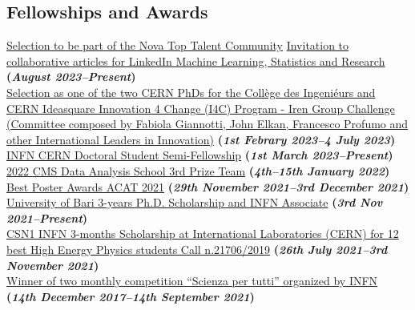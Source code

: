 \documentclass[11pt]{res}
\newcommand{\MarginText}[1]{\section{#1}\vspace{10pt}}
\begin{document}
\begin{resume}
\MarginText{Fellowships and Awards}
\href{https://digital-agent.novatalent.net/open/certificate/1OBEUZCU6M7ZHHROVP0F8870F}{Selection to be part of the Nova Top Talent Community}
\href{https://www.linkedin.com/advice/1/how-do-you-avoid-bias-machine-learning-imbalanced}{Invitation to collaborative articles for LinkedIn Machine Learning, Statistics and Research} \textbf{(\textit{August 2023--Present})}\\
\href{https://www.repubblica.it/tecnologia/2023/07/06/news/innovation_4_change__industry_leaders_summit_cern_di_ginevra-406876410/}{Selection as one of the two CERN PhDs for the Collège des Ingeniéurs and CERN Ideasquare Innovation 4 Change (I4C) Program - Iren Group Challenge (Committee composed by Fabiola Giannotti, John Elkan, Francesco Profumo and other International Leaders in Innovation)} \textbf{(\textit{1st Febrary 2023--4 July 2023})}\\
\href{https://drive.google.com/file/d/1gvGcpn9FgzyjUBVwmCCa8zAbnvYefJAa/view?usp=share_link}{INFN CERN Doctoral Student Semi-Fellowship} \textbf{(\textit{1st March 2023--Present})}\\
\href{https://indico.cern.ch/event/1088671/}{2022 CMS Data Analysis School 3rd Prize Team} \textbf{(\textit{4th--15th January 2022})}\\
\href{https://indico.cern.ch/event/855454/contributions/4596351/}{Best Poster Awards ACAT 2021} \textbf{(\textit{29th November 2021--3rd December 2021})}\\
\href{https://dottorato.fisica.uniba.it}{University of Bari 3-years Ph.D. Scholarship and INFN Associate} \textbf{(\textit{3rd Nov 2021--Present})}\\
\href{https://drive.google.com/file/d/1-3EpNjAJlxgwI7W7nlvAxtIPrqbM1Xud/view?usp=sharing}{CSN1 INFN 3-months Scholarship at International Laboratories (CERN) for 12 best High Energy Physics students Call n.21706/2019} \textbf{(\textit{26th July 2021--3rd November 2021})}\\
\href{https://scienzapertutti.infn.it/spazio-scuola/concorso-mensile-sxt}{Winner of two monthly competition “Scienza per tutti” organized by INFN} \textbf{(\textit{14th December 2017--14th September 2021})}\\


\end{resume}
\end{document}
